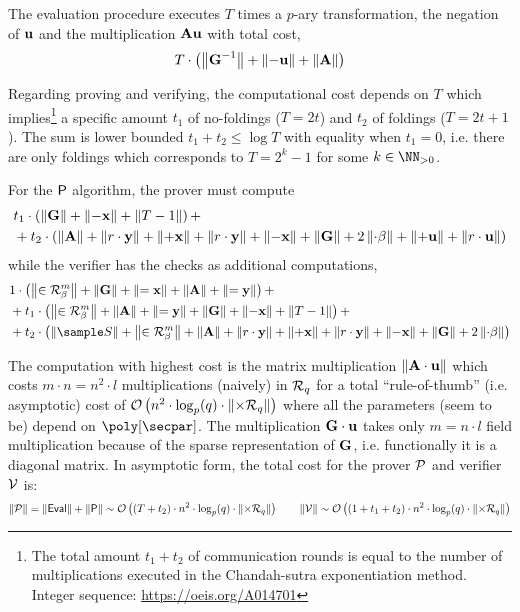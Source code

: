 The evaluation procedure executes $T$ times a $p$-ary transformation, the negation of $\vu$ and the
multiplication $\vA \vu$ with total cost,
\[ T \cdot \left(\comp{ \vGi } + \comp{- \vu} + \comp{\vA}\right)\]


Regarding proving and verifying, the computational cost depends on $T$ which
implies\footnote{The total amount $t_1+t_2$ of communication rounds is equal to the number of
multiplications executed in the Chandah-sutra exponentiation method.
Integer sequence: \url{https://oeis.org/A014701}}
a specific
amount $t_1$ of no-foldings ($T = 2t$) and $t_2$ of foldings ($T=2t+1$).
The sum is lower bounded $t_1 + t_2 \leq \log{T}$ with equality when $t_1 = 0$, i.e. there are only
foldings which corresponds to $T = 2^k -1$ for some $k \in \NN_{>0}$.

For the $\textsf{P}$ algorithm, the prover must compute
\begin{align*}
	& t_1 \cdot \left( \comp{\vG}+\comp{-\vx} +\comp{T-1} \right) +\\
	& + t_2 \cdot \left( \comp{\vA} + \comp{r\cdot \vy} + \comp{+\vx} + \comp{r\cdot \vy}
		+ \comp{-\vx} + \comp{\vG} + 2\comp{\cdot\beta} + \comp{+\vu} + \comp{r\cdot \vu}\right)
\end{align*}
while the verifier has the checks as additional computations,
\begin{align*}
	& 1 \cdot \left(
		\comp{\in \Rring[\beta]^m} + \comp{\vG} + \comp{=\vx} + \comp{\vA} + \comp{=\vy}\right) +\\
	& + t_1 \cdot \left(
		\comp{\in \Rring[\beta]^m} + \comp{\vA} + \comp{=\vy} +
		\comp{\vG}+\comp{-\vx} +\comp{T-1} \right) +\\
	& + t_2 \cdot \left(
		\comp{\sample S} + \comp{\in \Rring[\beta]^m} +
		\comp{\vA} + \comp{r\cdot \vy} + \comp{+\vx} + \comp{r\cdot \vy}
		+ \comp{-\vx} + \comp{\vG} + 2\comp{\cdot\beta}\right)
\end{align*}


The computation with highest cost is the matrix multiplication $\comp{\vA \cdot \vu}$ which
costs $m \cdot n = n^2 \cdot l$ multiplications (naively) in $\Rring[q]$ for a total
``rule-of-thumb'' (i.e. asymptotic) cost of
$\asymp{n^2 \cdot \log_{\pprime}(\qprime) \cdot \comp{ \times \Rring[q]}}$
where all the parameters (seem to be) depend on $\poly[\secpar]$.
The multiplication $\vG\cdot\vu$ takes only $m = n \cdot l$ field multiplication because
of the sparse representation of $\vG$, i.e. functionally it is a diagonal matrix.
%
In asymptotic form, the total cost for the prover $\mathcal{P}$ and verifier $\mathcal{V}$ is:
\[ \comp{\advP} = \comp{\eval} + \comp{\prove}
	\sim
	\asymp{(T + t_2) \cdot n^2 \cdot \log_{\pprime}(\qprime) \cdot \comp{ \times \Rring[q]}}
	\qquad \comp{\advV} \sim \asymp{(1 + t_1 + t_2) \cdot n^2 \cdot
		\log_{\pprime}(\qprime) \cdot \comp{ \times \Rring[q]}}\]

